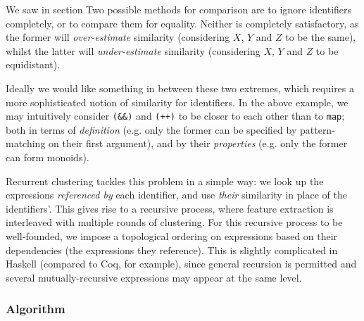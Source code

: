 We saw in section Two possible methods for comparison are to ignore identifiers completely, or to compare them for equality. Neither is completely satisfactory, as the former will \emph{over-estimate} similarity (considering $X$, $Y$ and $Z$ to be the same), whilst the latter will \emph{under-estimate} similarity (considering $X$, $Y$ and $Z$ to be equidistant).

Ideally we would like something in between these two extremes, which requires a more sophisticated notion of similarity for identifiers. In the above example, we may intuitively consider \texttt{(\&\&)} and \texttt{(++)} to be closer to each other than to \texttt{map}; both in terms of \emph{definition} (e.g. only the former can be specified by pattern-matching on their first argument), and by their \emph{properties} (e.g. only the former can form monoids).

Recurrent clustering tackles this problem in a simple way: we look up the expressions \emph{referenced by} each identifier, and use \emph{their} similarity in place of the identifiers'. This gives rise to a recursive process, where feature extraction is interleaved with multiple rounds of clustering. For this recursive process to be well-founded, we impose a topological ordering on expressions based on their dependencies (the expressions they reference). This is slightly complicated in Haskell (compared to Coq, for example), since general recursion is permitted and several mutually-recursive expressions may appear at the same level.

\subsubsection{Algorithm}
\label{sec:algorithm}
\iffalse TODO: the code should go in the implementation section rather than here \fi
\iffalse TODO: give a more abstract presentation, using mathematical notation \fi
\iffalse TODO: maybe focus on the ``interesting cases'', and defer the nitty-gritty of extending the environment, etc. to the implementation section? \fi
\iffalse TODO: Define rose trees \fi
\iffalse TODO: Show an example from earlier, e.g. factorial \fi
\iffalse TODO: Split into three parts: expressions to rose trees of features; rose trees to matrices to vectors; k-means clustering \fi
\iffalse TODO: highlight the recurrent nature of the algorithm \fi
\iffalse TODO: I would probably just restructure:
 - start with the syntax, get to show how, for every line of figure 1, extraction works
 - then transformation to feature vectors
 - then k-means
obviously, they are mutually recursive...
\fi

